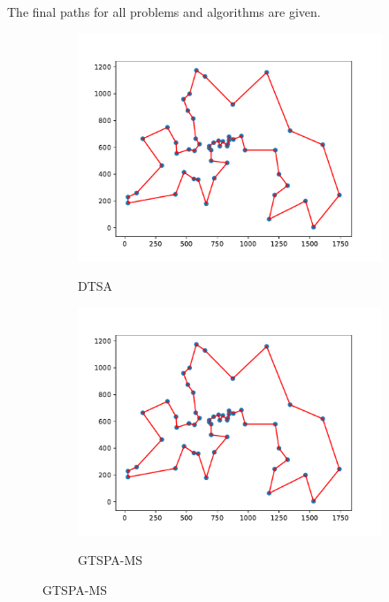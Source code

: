\documentclass[12pt]{article}
\theoremstyle{plain}
\theoremstyle{definition}
\theoremstyle{remark}
\begin{document}
The final paths for all problems and algorithms are given.

\begin{figure}[ht]
	\centering
	\begin{subfigure}{.5\textwidth}
		\centering
		\includegraphics[scale = 0.44]{../../Implementation/gen/best_path_dtsa_berlin52}
		\label{fig:best_path_dtsa_berlin52}
		\caption{DTSA}
	\end{subfigure}%
	\begin{subfigure}{.5\textwidth}
		\centering
		\includegraphics[scale = 0.44]{../../Implementation/gen/best_path_gtspams_berlin52}
		\label{fig:best_path_gtspams_berlin52}
		\caption{GTSPA-MS}
	\end{subfigure}

\end{figure}
\end{document}
